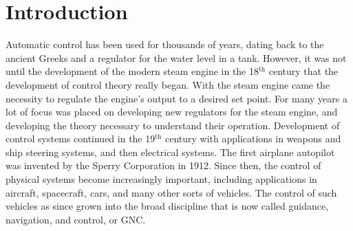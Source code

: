 \chapter{Introduction}\label{ch.Introduction}

Automatic control has been used for thousands of years, dating back to the ancient Greeks and a regulator for the water level in a tank.
However, it was not until the development of the modern steam engine in the 18$^{\text{th}}$ century that the development of control theory really began.
With the steam engine came the necessity to regulate the engine's output to a desired set point.
For many years a lot of focus was placed on developing new regulators for the steam engine, and developing the theory necessary to understand their operation.
Development of control systems continued in the 19$^{\text{th}}$ century with applications in weapons and ship steering systems, and then electrical systems.
The first airplane autopilot was invented by the Sperry Corporation in 1912.
Since then, the control of physical systems become increasingly important, including applications in aircraft, spacecraft, cars, and many other sorts of vehicles.
The control of such vehicles as since grown into the broad discipline that is now called guidance, navigation, and control, or GNC.\@

